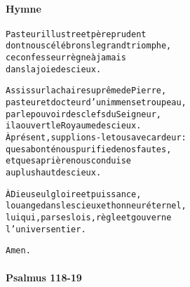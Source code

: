 \documentclass[twoside]{article}
\begin{document}
\begin{paracol}[1]{2}

\switchcolumn

\paragraph{Hymne}
\begin{alltt}\normalfont
             Pasteur illustre et père prudent
             dont nous célébrons le grand triomphe,
             ce confesseur règne à jamais
             dans la joie des cieux.
             
             Assis sur la chaire suprême de Pierre,
             pasteur et docteur d’un immense troupeau,
             par le pouvoir des clefs du Seigneur,
             il a ouvert le Royaume des cieux.
\newpage
             À présent, supplions-le tous avec ardeur :
             que sa bonté nous purifie de nos fautes,
             et que sa prière nous conduise
             au plus haut des cieux.
             
             À Dieu seul gloire et puissance,
             louange dans les cieux et honneur éternel,
             lui qui, par ses lois, règle et gouverne
             l’univers entier.
             
             Amen.
\end{alltt}

\switchcolumn*


\paragraph{Psalmus 118-19}



\end{paracol}
\end{document}
